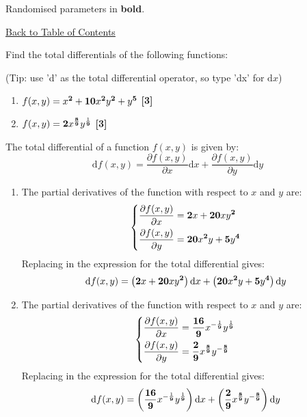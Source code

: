 \documentclass[a4paper, leqno, 12pt]{report}
\newenvironment{top_enumerate}{
\begin{enumerate}
  \setlength{\itemsep}{2em}
  \setlength{\topsep}{-0pt}
  \setlength{\partopsep}{-0pt}
}{\end{enumerate}}
\begin{document}
Randomised parameters in \textbf{bold}. 

\hyperlink{contents}{Back to Table of Contents}
\begin{top_enumerate}
\item Find the total differentials of the following functions:

(Tip: use 'd' as the total differential operator, so type 'dx' for $\textrm{d}x$)
 
\setcounter{equation}{0}  %
\begin{enumerate}
	\setlength{\topsep}{-0pt}
	\setlength{\partopsep}{-0pt}
	\setlength{\itemsep}{10pt}
			\item $f(x,y) = x^{\bf 2} + {\bf 10}x^{\bf 2}y^{\bf 2} + y^{\bf 5}$
	 \quad \textbf{[3]}
		\item $f(x,y) = {\bf 2}x^{\frac{{\bf 8}}{{\bf 9}}}y^{\frac{1}{{\bf 9}}}$
	 \quad \textbf{[3]}
\end{enumerate}\addtocounter{enumi}{-1}
\item The total differential of a function $f(x,y)$ is given by:
\[
\textrm{d}f(x,y) = \frac{\partial f(x,y)}{\partial x}\textrm{d}x + \frac{\partial f(x,y)}{\partial y}\textrm{d}y
\]
 
\setcounter{equation}{0}  %
\begin{enumerate}
	\setlength{\topsep}{-0pt}
	\setlength{\partopsep}{-0pt}
	\setlength{\itemsep}{10pt}
			\item The partial derivatives of the function with respect to $x$ and $y$ are:
	\[
	\left\{\begin{aligned}
	\frac{\partial f(x,y)}{\partial x} & = {\bf 2}x + {\bf 20}xy^{\bf 2}\\
	\frac{\partial f(x,y)}{\partial y} & = {\bf 20}x^{\bf 2}y + {\bf 5}y^{\bf 4}\\
	\end{aligned}\right.
	\]
	Replacing in the expression for the total differential gives:
	\[
	\textrm{d}f(x,y) = \left({\bf 2}x + {\bf 20}xy^{\bf 2}\right)\textrm{d}x + \left({\bf 20}x^{\bf 2}y + {\bf 5}y^{\bf 4}\right)\textrm{d}y
	\]
	 \quad \textbf{}
		\item The partial derivatives of the function with respect to $x$ and $y$ are:
	\[
	\left\{\begin{aligned}
	\frac{\partial f(x,y)}{\partial x} & = \frac{{\bf 16}}{{\bf 9}}x^{-\frac{1}{{\bf 9}}}y^{\frac{1}{{\bf 9}}}\\
	\frac{\partial f(x,y)}{\partial y} & = \frac{{\bf 2}}{{\bf 9}}x^{\frac{{\bf 8}}{{\bf 9}}}y^{-\frac{{\bf 8}}{{\bf 9}}}\\
	\end{aligned}\right.
	\]
	Replacing in the expression for the total differential gives:
	\[
	\textrm{d}f(x,y) = \left(\frac{{\bf 16}}{{\bf 9}}x^{-\frac{1}{{\bf 9}}}y^{\frac{1}{{\bf 9}}}\right)\textrm{d}x + \left(\frac{{\bf 2}}{{\bf 9}}x^{\frac{{\bf 8}}{{\bf 9}}}y^{-\frac{{\bf 8}}{{\bf 9}}}\right)\textrm{d}y
	\]
	 \quad \textbf{}
\end{enumerate}\newpage
\end{top_enumerate}
\end{document}

